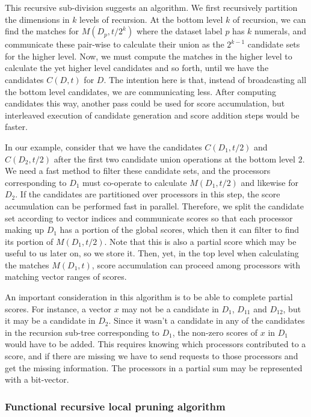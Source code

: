 \documentclass{comjnl}
\begin{document}
This recursive sub-division suggests an algorithm. We first
recursively partition the dimensions in $k$ levels of recursion. At the bottom level
$k$ of recursion, we can find the matches for $M(D_p, t/2^k)$ where
the dataset label $p$ has $k$ numerals, and communicate these
pair-wise to calculate their union as the $2^{k-1}$ candidate sets for
the higher level. Now, we must compute the matches in the higher level
to calculate the yet higher level candidates and so forth, until we
have the candidates $C(D,t)$ for $D$. The intention here is that,
instead of broadcasting all the bottom level candidates, we are
communicating less. After computing candidates this way, another pass
could be used for score accumulation, but interleaved execution of
candidate generation and score addition steps would be faster.

In our example, consider that we have the candidates $C(D_1, t/2)$ and
$C(D_2, t/2)$ after the first two candidate union operations at the
bottom level $2$. We need a fast method to filter these candidate
sets, and the processors corresponding to $D_1$ must co-operate to
calculate $M(D_1, t/2)$ and likewise for $D_2$. If the candidates are
partitioned over processors in this step, the score accumulation can
be performed fast in parallel. Therefore, we split the candidate set
according to vector indices and communicate scores so that each
processor making up $D_1$ has a portion of the global scores, which
then it can filter to find its portion of $M(D_1, t/2)$. Note that 
this is also a partial score which may be useful to us later on, so we
store it.  Then, yet, in the top level when calculating the matches
$M(D_1, t)$, score accumulation can proceed among processors with
matching vector ranges of scores.

An important consideration in this algorithm is to be able to complete
partial scores. For instance, a vector $x$ may not be a candidate in
$D_1$, $D_{11}$ and $D_{12}$, but it may be a candidate in
$D_2$. Since it wasn't a candidate in any of the candidates in the
recursion sub-tree corresponding to $D_1$, the non-zero scores of $x$
in $D_1$ would have to be added. This requires knowing which
processors contributed to a score, and if there are missing we have to
send requests to those processors and get the missing information. The
processors in a partial sum may be represented with a bit-vector.

\subsubsection{Functional recursive local pruning algorithm}
\end{document}
